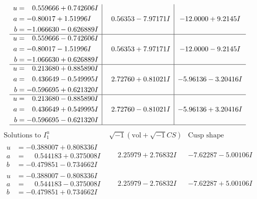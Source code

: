 \documentclass[1p]{elsarticle_modified}
\theoremstyle{definition}
\newcommand{\I}{\sqrt{-1}}
\begin{document}
$$\begin{array}{c|c|c}
\begin{aligned}
u &= \phantom{-}0.559666 + 0.742606 I \\
a &= -0.80017 + 1.51996 I \\
b &= -1.066630 - 0.626889 I\end{aligned}
 & \phantom{-}0.56353 - 7.97171 I & -12.0000 + 9.2145 I \\ \hline\begin{aligned}
u &= \phantom{-}0.559666 - 0.742606 I \\
a &= -0.80017 - 1.51996 I \\
b &= -1.066630 + 0.626889 I\end{aligned}
 & \phantom{-}0.56353 + 7.97171 I & -12.0000 - 9.2145 I \\ \hline\begin{aligned}
u &= \phantom{-}0.213680 + 0.885890 I \\
a &= \phantom{-}0.436649 - 0.549995 I \\
b &= -0.596695 + 0.621320 I\end{aligned}
 & \phantom{-}2.72760 + 0.81021 I & -5.96136 - 3.20416 I \\ \hline\begin{aligned}
u &= \phantom{-}0.213680 - 0.885890 I \\
a &= \phantom{-}0.436649 + 0.549995 I \\
b &= -0.596695 - 0.621320 I\end{aligned}
 & \phantom{-}2.72760 - 0.81021 I & -5.96136 + 3.20416 I\\
 \hline 
 \end{array}$$\newpage$$\begin{array}{c|c|c}  
\text{Solutions to }I^u_{1}& \I (\text{vol} + \sqrt{-1}CS) & \text{Cusp shape}\\
 \hline 
\begin{aligned}
u &= -0.388007 + 0.808336 I \\
a &= \phantom{-}0.544183 + 0.375008 I \\
b &= -0.479851 - 0.734662 I\end{aligned}
 & \phantom{-}2.25979 + 2.76832 I & -7.62287 - 5.00106 I \\ \hline\begin{aligned}
u &= -0.388007 - 0.808336 I \\
a &= \phantom{-}0.544183 - 0.375008 I \\
b &= -0.479851 + 0.734662 I\end{aligned}
 & \phantom{-}2.25979 - 2.76832 I & -7.62287 + 5.00106 I \\ \hline\begin{aligned}

\end{aligned}
\end{array}$$
\end{document}
